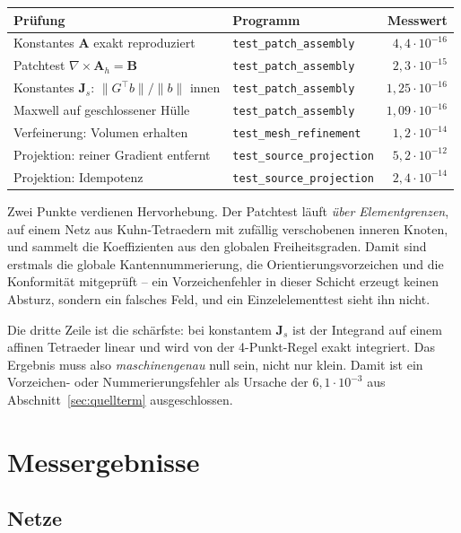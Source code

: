 \documentclass[11pt,a4paper]{article}
\newcommand{\Js}{\mathbf{J}_s}
\begin{document}
\begin{center}
\begin{tabular}{llr}
\toprule
Prüfung & Programm & Messwert \\
\midrule
Konstantes $\mathbf{A}$ exakt reproduziert & \texttt{test\_patch\_assembly} & $4{,}4\cdot10^{-16}$ \\
Patchtest $\nabla\times\mathbf{A}_h = \mathbf{B}$ & \texttt{test\_patch\_assembly} & $2{,}3\cdot10^{-15}$ \\
Konstantes $\Js$: $\|G^{\!\top}b\|/\|b\|$ innen & \texttt{test\_patch\_assembly} & $1{,}25\cdot10^{-16}$ \\
Maxwell auf geschlossener Hülle & \texttt{test\_patch\_assembly} & $1{,}09\cdot10^{-16}$ \\
Verfeinerung: Volumen erhalten & \texttt{test\_mesh\_refinement} & $1{,}2\cdot10^{-14}$ \\
Projektion: reiner Gradient entfernt & \texttt{test\_source\_projection} & $5{,}2\cdot10^{-12}$ \\
Projektion: Idempotenz & \texttt{test\_source\_projection} & $2{,}4\cdot10^{-14}$ \\
\bottomrule
\end{tabular}
\end{center}

Zwei Punkte verdienen Hervorhebung. Der Patchtest läuft \emph{über
Elementgrenzen}, auf einem Netz aus Kuhn-Tetraedern mit zufällig verschobenen
inneren Knoten, und sammelt die Koeffizienten aus den globalen
Freiheitsgraden. Damit sind erstmals die globale Kantennummerierung, die
Orientierungsvorzeichen und die Konformität mitgeprüft -- ein Vorzeichenfehler
in dieser Schicht erzeugt keinen Absturz, sondern ein falsches Feld, und ein
Einzelelementtest sieht ihn nicht.

Die dritte Zeile ist die schärfste: bei konstantem $\Js$ ist der Integrand auf
einem affinen Tetraeder linear und wird von der 4-Punkt-Regel exakt
integriert. Das Ergebnis muss also \emph{maschinengenau} null sein, nicht nur
klein. Damit ist ein Vorzeichen- oder Nummerierungsfehler als Ursache der
$6{,}1\cdot10^{-3}$ aus Abschnitt~\ref{sec:quellterm} ausgeschlossen.

\section{Messergebnisse}

\subsection{Netze}
\end{document}
